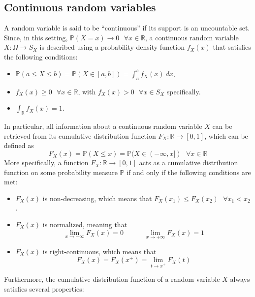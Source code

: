 \documentclass{report}
\begin{document}
\subsection{Continuous random variables}
A random variable is said to be ``continuous'' if its support is an uncountable set. \newline
Since, in this setting, $\displaystyle \mathbb{P}(X = x) \to 0 \text{ } \forall x \in \mathbb{R}$, a continuous random variable $\displaystyle X: \Omega \to S_X$ is described using a probability density function $\displaystyle f_X(x)$ that satisfies the following conditions:
\begin{itemize}
    \item $\displaystyle \mathbb{P}(a \leq X \leq b) = \mathbb{P}(X \in [a, b]) = \int_a^b f_X(x) \ dx$.
    \item $\displaystyle f_X(x) \ge 0 \text{ } \forall x \in \mathbb{R}$, with $\displaystyle f_X(x) > 0 \text{ } \forall x \in S_X$ specifically.
    \item $\displaystyle \int_{\mathbb{R}} f_X(x) = 1$.
\end{itemize}
In particular, all information about a continuous random variable $\displaystyle X$ can be retrieved from its cumulative distribution function $\displaystyle F_X: \mathbb{R} \to [0, 1]$, which can be defined as
\[F_X(x) = \mathbb{P}(X \leq x) = \mathbb{P}(X \in (-\infty, x]) \text{ } \forall x \in \mathbb{R}\]
More specifically, a function $\displaystyle F_X: \mathbb{R} \to [0, 1]$ acts as a cumulative distribution function on some probability measure $\displaystyle \mathbb{P}$ if and only if the following conditions are met:
\begin{itemize}
    \item $\displaystyle F_X(x)$ is non-decreasing, which means that $\displaystyle F_X(x_1) \leq F_X(x_2) \text{ } \forall x_1 < x_2$.
    \item $\displaystyle F_X(x)$ is normalized, meaning that
    \[\lim_{x \to -\infty} F_X(x) = 0 \quad\quad\quad \lim_{x \to +\infty} F_X(x) = 1\]
    \item $\displaystyle F_X(x)$ is right-continuous, which means that
    \[F_X(x) = F_X(x^+)= \lim_{t \to x^+} F_X(t)\]
\end{itemize}
Furthermore, the cumulative distribution function of a random variable $\displaystyle X$ always satisfies several properties:
\end{document}
